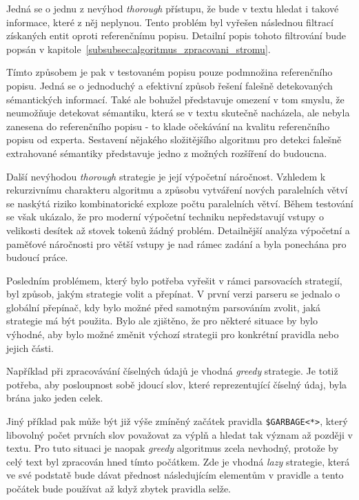 Jedná se o jednu z nevýhod \emph{thorough} přístupu, že bude v textu hledat i takové informace, které z něj neplynou.
Tento problém byl vyřešen následnou filtrací získaných entit oproti referenčnímu popisu.
Detailní popis tohoto filtrování bude popsán v kapitole~\ref{subsubsec:algoritmus_zpracovani_stromu}.

Tímto způsobem je pak v testovaném popisu pouze podmnožina referenčního popisu.
Jedná se o jednoduchý a efektivní způsob řešení falešně detekovaných sémantických informací.
Také ale bohužel představuje omezení v tom smyslu, že neumožňuje detekovat sémantiku, která se v textu skutečně nacházela,
ale nebyla zanesena do referenčního popisu - to klade očekávání na kvalitu referenčního popisu od experta.
Sestavení nějakého složitějšího algoritmu pro detekci falešně extrahované sémantiky představuje jedno z možných rozšíření do budoucna.

Další nevýhodou \emph{thorough} strategie je její výpočetní náročnost.
Vzhledem k rekurzivnímu charakteru algoritmu a způsobu vytváření nových paralelních větví
se naskýtá riziko kombinatorické exploze počtu paralelních větví.
Během testování se však ukázalo, že pro moderní výpočetní techniku nepředstavují vstupy o velikosti desítek až stovek tokenů žádný problém.
Detailnější analýza výpočetní a paměťové náročnosti pro větší vstupy je nad rámec zadání a byla ponechána pro budoucí práce.

Posledním problémem, který bylo potřeba vyřešit v rámci parsovacích strategií, byl způsob, jakým strategie volit a přepínat.
V první verzi parseru se jednalo o globální přepínač, kdy bylo možné před samotným parsováním zvolit, jaká strategie má být použita.
Bylo ale zjištěno, že pro některé situace by bylo výhodné, aby bylo možné změnit výchozí strategii pro konkrétní pravidla nebo jejich části.

Například při zpracovávání číselných údajů je vhodná \emph{greedy} strategie.
Je totiž potřeba, aby posloupnost sobě jdoucí slov, které reprezentující číselný údaj, byla brána jako jeden celek.

Jiný příklad pak může být již výše zmíněný začátek pravidla \texttt{\$GARBAGE<*>},
který libovolný počet prvních slov považovat za výplň a hledat tak význam až později v textu.
Pro tuto situaci je naopak \emph{greedy} algoritmus zcela nevhodný, protože by celý text byl zpracován hned tímto počátkem.
Zde je vhodná \emph{lazy} strategie, která ve své podstatě bude dávat přednost následujícím elementům
v pravidle a tento počátek bude používat až když zbytek pravidla selže.

